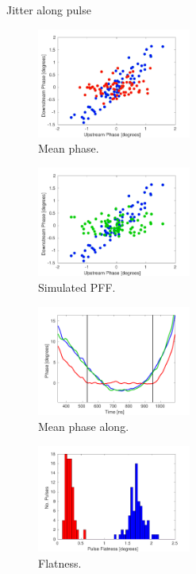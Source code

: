 Jitter along pulse

\begin{figure}
  \centering
  \includegraphics[width=0.45\textwidth]{Figures/feedforward/BestFF_Real}
  \caption{Mean phase.}
  \label{f:BestFF_Real}
\end{figure}

\begin{figure}
  \centering
  \includegraphics[width=0.45\textwidth]{Figures/feedforward/BestFF_Simulated}
  \caption{Simulated PFF.}
  \label{f:BestFF_Simulated}
\end{figure}


\begin{figure}
  \centering
  \includegraphics[width=0.45\textwidth]{Figures/feedforward/BestFF_MeanPhaseAlong}
  \caption{Mean phase along.}
  \label{f:BestFF_MeanPhaseAlong}
\end{figure}

\begin{figure}
  \centering
  \includegraphics[width=0.45\textwidth]{Figures/feedforward/BestFF_Flatness}
  \caption{Flatness.}
  \label{f:BestFF_Flatness}
\end{figure}


